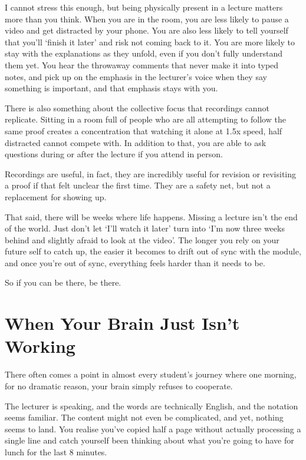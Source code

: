 I cannot stress this enough, but being physically present in a lecture matters more than you think. When you are in the room, you are less likely to pause a video and get distracted by your phone. You are also less likely to tell yourself that you'll `finish it later' and risk not coming back to it. You are more likely to stay with the explanations as they unfold, even if you don't fully understand them yet. You hear the throwaway comments that never make it into typed notes, and pick up on the emphasis in the lecturer's voice when they say something is important, and that emphasis stays with you. 

There is also something about the collective focus that recordings cannot replicate. Sitting in a room full of people who are all attempting to follow the same proof creates a concentration that watching it alone at 1.5x speed, half distracted cannot compete with. In addition to that, you are able to ask questions during or after the lecture if you attend in person. 

Recordings are useful, in fact, they are incredibly useful for revision or revisiting a proof if that felt unclear the first time. They are a safety net, but not a replacement for showing up. 

That said, there will be weeks where life happens. Missing a lecture isn’t the end of the world. Just don’t let `I’ll watch it later' turn into `I’m now three weeks behind and slightly afraid to look at the video'. The longer you rely on your future self to catch up, the easier it becomes to drift out of sync with the module, and once you're out of sync, everything feels harder than it needs to be. 

So if you can be there, be there. 

\section{When Your Brain Just Isn't Working}

There often comes a point in almost every student's journey where one morning, for no dramatic reason, your brain simply refuses to cooperate. 

The lecturer is speaking, and the words are technically English, and the notation seems familiar. The content might not even be complicated, and yet, nothing seems to land. You realise you've copied half a page without actually processing a single line and catch yourself been thinking about what you're going to have for lunch for the last 8 minutes. 

